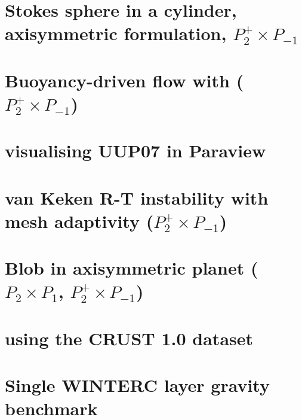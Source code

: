 \documentclass[a4paper,11pt]{report}
\begin{document}
\chapter{Stokes sphere in a cylinder, axisymmetric formulation, $P_2^+\times P_{-1}$ \label{f92}} %

\chapter{Buoyancy-driven flow with ($P_2^+\times P_{-1}$) \label{f93}} %

\chapter{visualising UUP07 in Paraview \label{f94}} %

\chapter{van Keken \etal R-T instability with mesh adaptivity ($P_2^+\times P_{-1}$) \label{f95}} %

\chapter{Blob in axisymmetric planet ($P_2\times P_1$, $P_2^+\times P_{-1}$) \label{f96}} %

\chapter{using the CRUST 1.0 dataset \label{f97}} %

\chapter{Single WINTERC layer gravity benchmark \label{f98}} %
\end{document}
